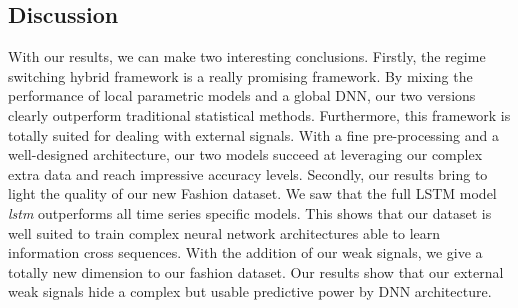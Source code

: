 \documentclass{article} %
\begin{document}
\subsection{Discussion}
\label{sec:discussion}


With our results, we can make two interesting conclusions. Firstly, the regime switching hybrid framework is a really promising framework. By mixing the performance of local parametric models and a global DNN, our two versions clearly outperform traditional statistical methods. Furthermore, this framework is totally suited for dealing with external signals. With a fine pre-processing and a well-designed architecture, our two models succeed at leveraging our complex extra data and reach impressive accuracy levels. Secondly, our results bring to light the quality of our new Fashion dataset. We saw that the full LSTM model \textit{lstm} outperforms all time series specific models. This shows that our dataset is well suited to train complex neural network architectures able to learn information cross sequences. With the addition of our weak signals, we give a totally new dimension to our fashion dataset. Our results show that our external weak signals hide a complex but usable predictive power by DNN architecture.
\end{document}
